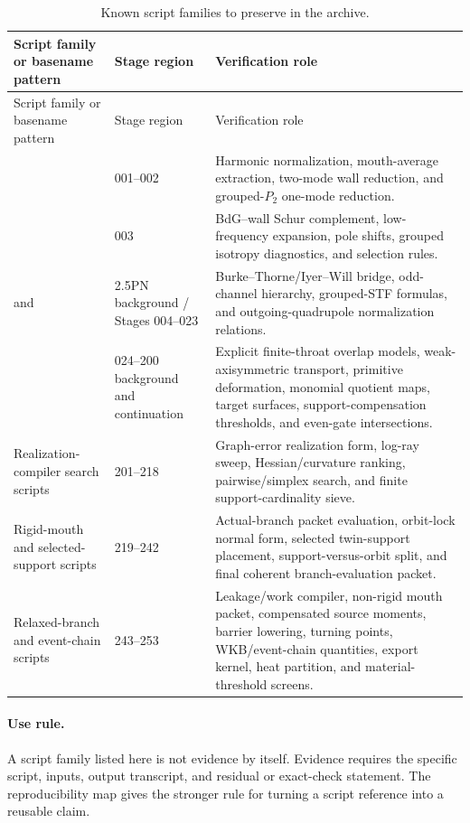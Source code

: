 \begin{longtable}{@{}L{0.30\textwidth}L{0.18\textwidth}L{0.40\textwidth}@{}}
\caption{Known script families to preserve in the archive.}\label{tab:known-script-families}\\
\toprule
Script family or basename pattern & Stage region & Verification role \\
\midrule
\endfirsthead
\toprule
Script family or basename pattern & Stage region & Verification role \\
\midrule
\endhead
{} & 001--002 & Harmonic normalization, mouth-average extraction, two-mode wall reduction, and grouped-\(P_2\) one-mode reduction. \\
\addlinespace
{} & 003 & BdG--wall Schur complement, low-frequency expansion, pole shifts, grouped isotropy diagnostics, and selection rules. \\
\addlinespace
{} and  & 2.5PN background / Stages 004--023 & Burke--Thorne/Iyer--Will bridge, odd-channel hierarchy, grouped-STF formulas, and outgoing-quadrupole normalization relations. \\
\addlinespace
{} & 024--200 background and continuation & Explicit finite-throat overlap models, weak-axisymmetric transport, primitive deformation, monomial quotient maps, target surfaces, support-compensation thresholds, and even-gate intersections. \\
\addlinespace
Realization-compiler search scripts & 201--218 & Graph-error realization form, log-ray sweep, Hessian/curvature ranking, pairwise/simplex search, and finite support-cardinality sieve. \\
\addlinespace
Rigid-mouth and selected-support scripts & 219--242 & Actual-branch packet evaluation, orbit-lock normal form, selected twin-support placement, support-versus-orbit split, and final coherent branch-evaluation packet. \\
\addlinespace
Relaxed-branch and event-chain scripts & 243--253 & Leakage/work compiler, non-rigid mouth packet, compensated source moments, barrier lowering, turning points, WKB/event-chain quantities, export kernel, heat partition, and material-threshold screens. \\
\bottomrule
\end{longtable}

\paragraph{Use rule.}
A script family listed here is not evidence by itself.  Evidence requires the specific script, inputs, output transcript, and residual or exact-check statement.  The reproducibility map gives the stronger rule for turning a script reference into a reusable claim.

